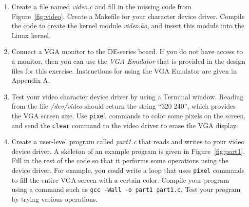 \documentclass[epsfig,10pt,fullpage]{article}
\begin{document}
\begin{enumerate}
\item Create a file named {\it video.c} and fill in the missing code from Figure~\ref{fig:video}.
Create a Makefile for your character device driver. Compile the code to create the 
kernel module {\it video.ko}, and insert this module into the Linux kernel. 
\item Connect a VGA monitor to the DE-series board. If you do not have access to a
monitor, then you can use the {\it VGA Emulator} that is provided in the design files for this 
exercise.  Instructions for using the VGA Emulator are given in Appendix A.
\item Test your video character device driver by using a Terminal window. Reading from the file
{\it /dev/video} should return the string ``320 240'', which provides the VGA screen size.
Use \texttt{pixel} commands to color some pixels on the screen, and send the 
\texttt{clear} command to the video driver to erase the VGA display.
\item
Create a user-level program called {\it part1.c} that reads and writes to your video device
driver. A skeleton of an example program is given in Figure~\ref{fig:part1}. Fill in the rest 
of the code so that it performs some operations using the device driver. For example, you could 
write a loop that uses \texttt{pixel} commands to fill the entire VGA screen with a certain color.
Compile your program using a command such as \texttt{gcc -Wall -o part1 part1.c}.
Test your program by trying various operations. 
\end{enumerate}
\end{document}
